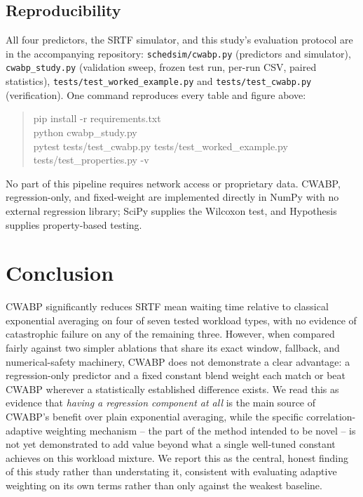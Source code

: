 \documentclass[10pt,twocolumn]{article}
\begin{document}
\subsection{Reproducibility}
All four predictors, the SRTF simulator, and this study's evaluation protocol are in the accompanying repository: \texttt{schedsim/cwabp.py} (predictors and simulator), \texttt{cwabp\_study.py} (validation sweep, frozen test run, per-run CSV, paired statistics), \texttt{tests/test\_worked\_example.py} and \texttt{tests/test\_cwabp.py} (verification). One command reproduces every table and figure above:
\begin{quote}\small\ttfamily
pip install -r requirements.txt\\
python cwabp\_study.py\\
pytest tests/test\_cwabp.py tests/test\_worked\_example.py\\
\phantom{pytest }tests/test\_properties.py -v
\end{quote}
No part of this pipeline requires network access or proprietary data. CWABP, regression-only, and fixed-weight are implemented directly in NumPy with no external regression library; SciPy supplies the Wilcoxon test, and Hypothesis supplies property-based testing.

\section{Conclusion}
CWABP significantly reduces SRTF mean waiting time relative to classical exponential averaging on four of seven tested workload types, with no evidence of catastrophic failure on any of the remaining three. However, when compared fairly against two simpler ablations that share its exact window, fallback, and numerical-safety machinery, CWABP does not demonstrate a clear advantage: a regression-only predictor and a fixed constant blend weight each match or beat CWABP wherever a statistically established difference exists. We read this as evidence that \emph{having a regression component at all} is the main source of CWABP's benefit over plain exponential averaging, while the specific correlation-adaptive weighting mechanism -- the part of the method intended to be novel -- is not yet demonstrated to add value beyond what a single well-tuned constant achieves on this workload mixture. We report this as the central, honest finding of this study rather than understating it, consistent with evaluating adaptive weighting on its own terms rather than only against the weakest baseline.
\end{document}
